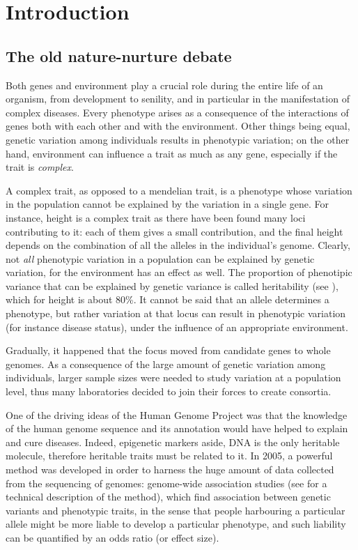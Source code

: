 \documentclass[../main.tex]{subfiles}
\begin{document}
\chapter{Introduction}

\section{The old nature-nurture debate}

Both genes and environment play a crucial role during the entire life of 
an organism, from development to senility, and in particular in the 
manifestation of complex diseases. Every phenotype arises as a 
consequence of the interactions of genes both with each other and with 
the environment. Other things being equal, genetic variation among 
individuals\autocite{Auton2015} results in phenotypic variation; on the 
other hand, environment can influence a trait as much as any gene, 
especially if the trait is \textit{complex}.

A complex trait, as opposed to a mendelian trait, is a phenotype whose 
variation in the population cannot be explained by the variation in a 
single gene. For instance, height is a complex trait as there have been 
found many loci contributing to it: each of them gives a small 
contribution, and the final height depends on the combination of all the 
alleles in the individual's genome. Clearly, not \textit{all} phenotypic 
variation in a population can be explained by genetic variation, for the 
environment has an effect as well. The proportion of phenotipic variance 
that can be explained by genetic variance is called heritability (see 
), which for height is about 
80\%\autocite{Visscher2008a}. It cannot be said that an allele 
determines a phenotype, but rather variation at that locus can result in 
phenotypic variation (for instance disease status), under the influence 
of an appropriate environment.

Gradually, it happened that the focus moved from candidate genes to 
whole genomes. As a consequence of the large amount of genetic variation 
among individuals, larger sample sizes were needed to study variation at 
a population level, thus many laboratories decided to join their forces 
to create consortia.

One of the driving ideas of the Human Genome 
Project\autocite{Lander2001,Venter2001} was that the knowledge of the 
human genome sequence and its annotation would have helped to explain 
and cure diseases. Indeed, epigenetic markers aside, DNA is the only 
heritable molecule, therefore heritable traits must be related to it. In 
2005, a powerful method was developed in order to harness the huge 
amount of data collected from the sequencing of genomes: genome-wide 
association studies (see  for a technical description of 
the method), which find association between genetic variants and 
phenotypic traits, in the sense that people harbouring a particular 
allele might be more liable to develop a particular phenotype, and such 
liability can be quantified by an odds ratio (or effect size).
\end{document}
